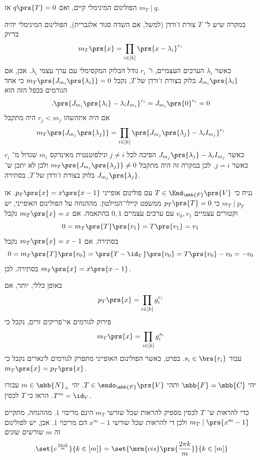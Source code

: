 \documentclass[a4paper,10pt,twoside,openany]{book}
\begin{document}
\begin{proposition}
הפולינום המינימלי קיים, ואם
$q\prs{T} = 0$
אז
$m_T \mid q$.
\end{proposition}

\begin{example}
במקרה שיש ל־%
$T$
צורת ז'ורדן (למשל, אם השדה סגור אלגברית), הפולינום המינימלי יהיה בדיוק
\[m_T\prs{x} = \prod_{i \in [k]} \prs{x - \lambda_i}^{r_i}\]
כאשר
$\lambda_i$
הערכים העצמיים, ו־%
$r_i$
גודל הבלוק המקסימלי עם ערך עצמי
$\lambda_i$.
אכן, אם
$J_{m_i}\prs{\lambda_i}$
בלוק בצורת ז'ורדן של
$T$,
נקבל
$m_T\prs{J_{m_i}\prs{\lambda_i}} = 0$
כי אחד הגורמים בכפל הזה הוא
\[\text{.} \prs{J_{m_i}\prs{\lambda_i} - \lambda_i I_{m_i}}^{r_i} = J_{m_i}\prs{0}^{r_i} = 0\]
אם היה איזהשהו
$r_j < m_j$
היה מתקבל
\[m_T\prs{J_{m_j}\prs{\lambda_j}} = \prod_{i \in [k]} \prs{J_{m_j}\prs{\lambda_j} - \lambda_i I_{m_j}}^{r_i}\]
כאשר
$J_{m_j}\prs{\lambda_j} - \lambda_i I_{m_j}$
הפיכה לכל
$j \neq i$
ונילפוטנטית מאינדקס
$m_i$
שגדול מ־%
$r_i$
כאשר
$j = i$.
לכן במקרה זה היה מתקבל
$m_T\prs{J_{m_j}\prs{\lambda_j}} \neq 0$
ולכן לא יתכן ש־%
$J_{m_j}\prs{\lambda_j}$
בלוק בצורת ז'ורדן של
$T$,
בסתירה.
\end{example}

\begin{example}
נניח כי
$T \in \End_{\mbb{F}}\prs{V}$
עם פולינום אופייני
$p_T\prs{x} = x \prs{x-1}$.
אז
$m_T \mid p_T$
כי
$p_T\prs{T} = 0$
ממשפט קיילי־המילטון.
מההנחה על הפולינום האופייני, יש וקטורים עצמיים
$v_0, v_1$
עם ערכים עצמיים
$0,1$
בהתאמה.
אם
$m_T\prs{x} = x$
נקבל
\[0 = m_T\prs{T}\prs{v_1} = T\prs{v_1} = v_1\]
בסתירה.
אם
$m_T\prs{x} = x-1$
נקבל
\[0 = m_T\prs{T}\prs{v_0} = \prs{T - \id_V}\prs{v_0} = T\prs{v_0} - v_0 = -v_0\]
בסתירה.
לכן
$m_T\prs{x} = x\prs{x-1}$.

באופן כללי, יותר, אם
\[p_T\prs{x} = \prod_{i \in [k]} g_i^{r_i}\]
פירוק לגורמים אי־פריקים זרים, נקבל כי
\[m_T\prs{x} = \prod_{i \in [k]} g_i^{s_i}\]
עבור
$s_i \in \brs{r_i}$.
בפרט, כאשר הפולינום האופייני מתפרק לגורמים לינארים נקבל כי
$m_T\prs{x} = p_T\prs{x}$.
\end{example}

\begin{exercisechap}
יהי
$\mbb{F} = \mbb{C}$
ותהי
$T \in \endo_{\mbb{F}}\prs{V}$.
יהי
$m \in \mbb{N}_+$
עבורו
$T^m = \id_V$.
הראו כי
$T$
לכסין.
\end{exercisechap}

\begin{solution}
כדי להראות ש־%
$T$
לכסין מספיק להראות שכל שורשי
$m_T$
הינם מריבוי
$1$.
מההנחה, מתקיים
$m_T \mid \prs{x^m - 1}$
ולכן די להראות שכל שורשי
$x^m - 1$
הם מריבוי
$1$.
אכן, יש לפולינום זה
$m$
שורשים שונים
\[\text{.} \set{e^{\frac{2 \pi i k}{m}}}{k \in [m]} = \set{\mrm{cis}\prs{\frac{2 \pi k}{m}}}{k \in [m]}\]
\end{solution}
\end{document}
